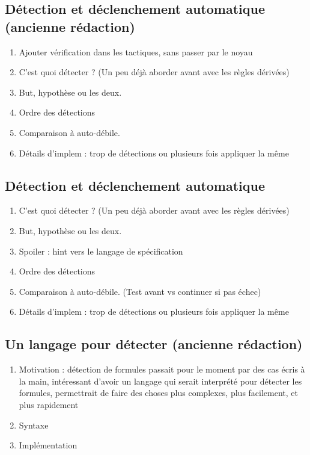 \documentclass[titlepage,draft]{article}
\begin{document}

\subsection*{Détection et déclenchement automatique (ancienne rédaction)}
\begin{enumerate}
    \item Ajouter vérification dans les tactiques, sans passer par le noyau
    \item C'est quoi détecter ? (Un peu déjà aborder avant avec les règles dérivées)
    \item But, hypothèse ou les deux.
    \item Ordre des détections
    \item Comparaison à auto-débile.
    \item Détails d'implem : trop de détections ou plusieurs fois appliquer la même
\end{enumerate}

\subsection{Détection et déclenchement automatique} \label{DetectionDeclenchement}
\begin{enumerate}
    \item C'est quoi détecter ? (Un peu déjà aborder avant avec les règles dérivées)
    \item But, hypothèse ou les deux.
    \item Spoiler : hint vers  le langage de spécification
    \item Ordre des détections
    \item Comparaison à auto-débile. (Test avant vs continuer si pas échec)
    \item Détails d'implem : trop de détections ou plusieurs fois appliquer la même
\end{enumerate}


\subsection*{Un langage pour détecter (ancienne rédaction)}
\begin{enumerate}
    \item Motivation : détection de formules passait pour le moment par des cas écris à la main, intéressant d'avoir un langage qui serait interprété pour détecter les formules, permettrait de faire des choses plus complexes, plus facilement, et plus rapidement
    \item Syntaxe
    \item Implémentation
\end{enumerate}
\end{document}
